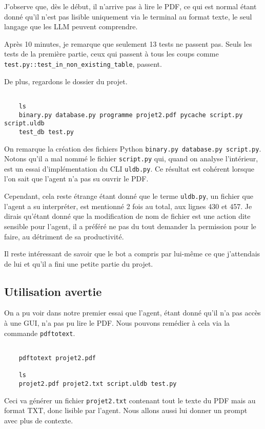 \documentclass[utf8]{article}
\begin{document}
J'observe que, dès le début, il n'arrive pas à lire le PDF, ce qui est normal étant donné qu'il n'est pas lisible uniquement via le terminal au format texte, le seul langage que les LLM peuvent comprendre.

Après 10 minutes, je remarque que seulement 13 tests ne passent pas. Seuls les tests de la première partie, ceux qui passent à tous les coups comme \texttt{test.py::test_in_non_existing_table}, passent.

De plus, regardons le dossier du projet.

\begin{verbatim}

    ls
    binary.py database.py programme projet2.pdf pycache script.py script.uldb
    test_db test.py
    \end{verbatim}

On remarque la création des fichiers Python \texttt{binary.py database.py script.py}.
Notons qu'il a mal nommé le fichier \texttt{script.py} qui, quand on analyse l'intérieur, est un essai d'implémentation du CLI \texttt{uldb.py}.
Ce résultat est cohérent lorsque l'on sait que l'agent n'a pas su ouvrir le PDF.

Cependant, cela reste étrange étant donné que le terme \texttt{uldb.py}, un fichier que l'agent a su interpréter, est mentionné 2 fois au total, aux lignes 430 et 457.
Je dirais qu'étant donné que la modification de nom de fichier est une action dite sensible pour l'agent, il a préféré ne pas du tout demander la permission pour le faire, au détriment de sa productivité.

Il reste intéressant de savoir que le bot a compris par lui-même ce que j'attendais de lui et qu'il a fini une petite partie du projet.

\subsection{Utilisation avertie}

On a pu voir dans notre premier essai que l'agent, étant donné qu'il n'a pas accès à une GUI, n'a pas pu lire le PDF. Nous pouvons remédier à cela via la commande \texttt{pdftotext}.

\begin{verbatim}

    pdftotext projet2.pdf

    ls
    projet2.pdf projet2.txt script.uldb test.py
    \end{verbatim}

Ceci va générer un fichier \texttt{projet2.txt} contenant tout le texte du PDF mais au format TXT, donc lisible par l'agent. Nous allons aussi lui donner un prompt avec plus de contexte.
\end{document}
